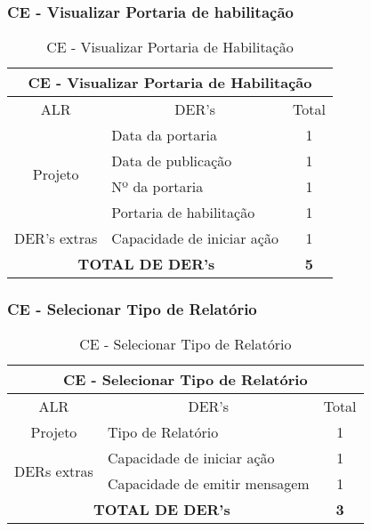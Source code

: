   \subsubsection{CE - Visualizar Portaria de habilitação}
  \begin{table}[!h]
\centering
\caption{CE - Visualizar Portaria de Habilitação}
\label{ce_visualizar_portaria_de_habilitacao}
\begin{tabular}{|c|l|c|}
\hline
\multicolumn{3}{|c|}{CE - Visualizar Portaria de Habilitação}                    \\ \hline
ALR                      & \multicolumn{1}{c|}{DER's} & Total \\ \hline
\multirow{4}{*}{Projeto} & Data da portaria                         & 1     \\ \cline{2-3} 
                         & Data de publicação            & 1     \\ \cline{2-3} 
                         & Nº da portaria      & 1     \\ \cline{2-3} 
                         & Portaria de habilitação              & 1     \\ \hline
DER's extras & Capacidade de iniciar ação             & 1 \\ \hline
\multicolumn{2}{|c|}{\textbf{TOTAL DE DER's}}                  & \textbf{5}     \\ \hline
\end{tabular}
\end{table}

      
	
   \subsubsection{CE - Selecionar Tipo de Relatório}
      

      \begin{table}[!h]
      \centering
      \caption{CE - Selecionar Tipo de Relatório}
      \label{ce_tipo_relatorio}
      \begin{tabular}{|c|l|c|}
      \hline
      \multicolumn{3}{|c|}{CE - Selecionar Tipo de Relatório}                              \\ \hline
      ALR                          & \multicolumn{1}{c|}{DER's}    & Total        \\ \hline
      Projeto                      & Tipo de Relatório             & 1            \\ \hline
      \multirow{2}{*}{DERs extras} & Capacidade de iniciar ação    & 1            \\ \cline{2-3} 
				  & Capacidade de emitir mensagem & 1            \\ \hline
       \multicolumn{2}{|c|}{\textbf{TOTAL DE DER's}}          & \textbf{3}         \\ \hline
      \end{tabular}
      \end{table}

